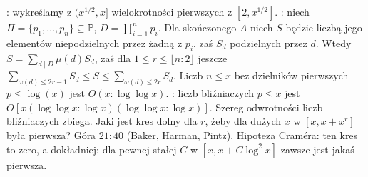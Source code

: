:  wykreślamy z $(x^{1/2}, x]$ wielokrotności pierwszych z $[2, x^{1/2}]$. 
: niech $\Pi = \{p_1, \ldots, p_n\} \subseteq \mathbb P$, $D = \prod_{i=1}^n p_i$.
Dla skończonego $A$ niech $S$ będzie liczbą jego elementów niepodzielnych przez żadną z $p_i$, zaś $S_d$ podzielnych przez $d$.
Wtedy $S = \sum_{d \mid D} \mu(d) S_d$, zaś dla $1 \le r \le \lfloor n : 2 \rfloor$ jeszcze $\sum_{\omega(d) \le 2r-1} S_d \le S \le \sum_{\omega(d) \le 2r} S_d$.
Liczb $n \le x$ bez dzielników pierwszych $p \le \log (x)$ jest $O(x : \log \log x)$. 
: liczb bliźniaczych $p \le x$ jest $O[x (\log \log x : \log x)(\log \log x : \log x)]$.
Szereg odwrotności liczb bliźniaczych zbiega.
Jaki jest kres dolny dla $r$, żeby dla dużych $x$ w $[x, x + x^r]$ była pierwsza? Góra $21:40$ (Baker, Harman, Pintz).
Hipoteza Craméra: ten kres to zero, a dokładniej: dla pewnej stałej $C$ w $[x, x + C \log ^2 x]$ zawsze jest jakaś pierwsza.


